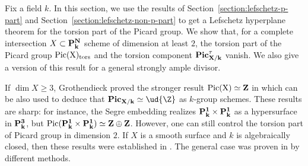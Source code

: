 \documentclass[11pt,reqno]{amsart}
\numberwithin{equation}{section}
\theoremstyle{definition}
\begin{document}
Fix a field $k$. In this section, we use the results of Section~\ref{section:lefschetz-p-part} and Section~\ref{section:lefschetz-non-p-part} to get a Lefschetz hyperplane theorem for the torsion part of the Picard group. We show that, for a complete intersection $X\subset \bf{P}^N_k$ scheme of dimension at least $2$, the torsion part of the Picard group $\rm{Pic}(X)_{\rm{tors}}$ and the torsion component $\bf{Pic}^\tau_{X/k}$ vanish. We also give a version of this result for a general strongly ample divisor. \smallskip

If $\dim X \geq 3$, Grothendieck proved the stronger result $\rm{Pic}(X) \simeq \bf{Z}$ in \cite[Exp.\ XII, Cor.~3.2]{SGA2} which can be also used to deduce that $\bf{Pic}_{X/k} \simeq \ud{\Z}$ as $k$-group schemes. These results are sharp: for instance, the Segre embedding realizes $\bf{P}^1_k\times \bf{P}^1_k$ as a hypersurface in $\bf{P}^3_k$, but $\rm{Pic}(\bf{P}^1_k\times \bf{P}^1_k) \simeq \bf{Z} \oplus \bf{Z}$. However, one can still control the torsion part of Picard group in dimension $2$. If $X$ is a smooth surface and $k$ is algebraically closed, then these results were established in \cite[Exp.\ XI, Th.~1.8]{SGA7_2}. The general case was proven in \cite[Cor.~7.2.3]{Ces-Scholze} by different methods.
\end{document}
